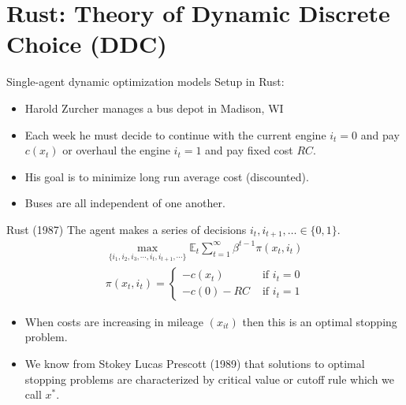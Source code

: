 \documentclass[aspectratio=169,11pt]{beamer}
\begin{document}
\section{Rust: Theory of Dynamic Discrete Choice (DDC)}

\begin{frame}{Single-agent dynamic optimization models}
Setup in Rust:
\begin{itemize}
\item Harold Zurcher manages a bus depot in Madison, WI
\item Each week he must decide to continue with the current engine $i_t=0$ and pay $c(x_{t})$ or overhaul the engine $i_t=1$ and pay fixed cost $RC$.
\item His goal is to minimize \alert{long run average cost} (discounted).
\item Buses are all  \alert{independent} of one another.
\end{itemize}
\end{frame}




\begin{frame}{Rust (1987)}
The agent makes a series of decisions $i_t,i_{t+1},\ldots \in \{0,1\}$.
\begin{eqnarray*}
\max_{\{i_1, i_2, i_3, \cdots, i_t, i_{t+1}, \cdots \}} \mathbb{E}_t \sum^{\infty}_{t=1} \beta^{t-1} \pi (x_t,i_t)\\
\pi \left(x_{t},i_{t} \right)=
		\begin{cases}
		-c\left(x_{t} \right)  & \mbox{ if }i_{t}=0\\		
		 -c\left(0\right) -RC& \mbox{ if }i_{t}=1
		\end{cases}
\end{eqnarray*}
\begin{itemize}
\item When costs are increasing in mileage $(x_{it})$ then this is an \alert{optimal stopping problem}.
\item We know from Stokey Lucas Prescott (1989) that solutions to optimal stopping problems are characterized by \alert{critical value} or \alert{cutoff rule} which we call $x^*$.
\end{itemize}
\end{frame}
\end{document}
